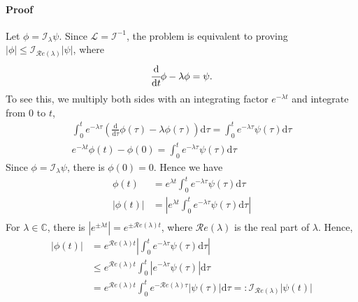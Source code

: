 \documentclass[]{uai2023}
\newcommand{\dt}[1]{\cfrac{\mathrm{d} #1}{\mathrm{d} t}}
\renewcommand{\L}{\mathcal{L}}
\newcommand{\I}{\mathcal{I}}
\renewcommand{\Re}[1]{\mathcal{R}e\left(#1\right)}
\begin{document}
    \paragraph{Proof} 
    Let $\phi = \I_\lambda \psi$. Since $\L = \I^{-1}$, the problem is equivalent to proving $|\phi| \leq \I_{\Re{\lambda}}|\psi|$, where
    \begin{equation}
        \dt{}\phi-\lambda\phi = \psi.
    \end{equation}
    To see this, we multiply both sides with an integrating factor $e^{-\lambda t}$ and integrate from $0$ to $t$,
    \begin{gather}
        \int_{0}^{t} e^{-\lambda \tau} \left(\frac{\mathrm{d}}{\mathrm{d}\tau}\phi(\tau)-\lambda\phi(\tau)\right)\mathrm{d}\tau = \int_{0}^{t} e^{-\lambda \tau}\psi(\tau) \mathrm{d}\tau\\
        e^{-\lambda t}\phi(t) - \phi(0) = \int_{0}^{t} e^{-\lambda \tau}\psi(\tau) \mathrm{d}\tau
    \end{gather}
    Since $\phi = \I_{\lambda} \psi$, there is $\phi(0) = 0$. Hence we have
    \begin{align}
        \phi(t) &= e^{\lambda t}\int_{0}^{t} e^{-\lambda \tau}\psi(\tau) \mathrm{d}\tau \\
        |\phi(t)| &= \left|e^{\lambda t}\int_{0}^{t} e^{-\lambda \tau}\psi(\tau) \mathrm{d}\tau\right| \\
    \end{align}
    For $\lambda \in \mathbb{C}$, there is $\left|e^{\pm \lambda t}\right| = e^{\pm \Re{\lambda} t}$, where $\Re{\lambda}$ is the real part of $\lambda$.
    Hence,
    \begin{align}
        |\phi(t)| &= e^{\Re{\lambda} t} \left|\int_{0}^{t} e^{-\lambda \tau}\psi(\tau) \mathrm{d}\tau \right| \\
        &\leq e^{\Re{\lambda} t} \int_{0}^{t} \left|e^{-\lambda \tau}\psi(\tau) \right|\mathrm{d}\tau  \\
        &=e^{\Re{\lambda} t} \int_{0}^{t} e^{-\Re{\lambda} \tau}|\psi(\tau)|\mathrm{d}\tau =: \I_{\Re{\lambda}}|\psi(t)|
    \end{align}
\end{document}
